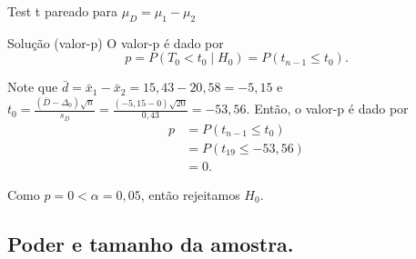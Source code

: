 \documentclass[9pt]{beamer}
\begin{document}
\begin{frame}{Test t pareado para $\mu_D = \mu_1 - \mu_2$}

\begin{block}{Solução (valor-p)}
	O valor-p é dado por
	$$p = P(T_0 < t_0 \mid H_0) = P(t_{n-1} \leq t_0).$$
	
	Note que $\bar{d} = \bar{x}_1 - \bar{x}_2 = 15,43 - 20,58 = -5,15$ e $t_0 = \frac{(\bar{D} - \Delta_0)\sqrt{n}}{s_D} = \frac{(-5,15 - 0)\sqrt{20}}{0,43} = -53,56$. Então, o valor-p é dado por
	\begin{align*}
	p &= P(t_{n-1} \leq t_0)\\
	&= P(t_{19} \leq -53,56)\\
	&= 0.
	\end{align*}
	
	Como $p=0 < \alpha = 0,05$, então rejeitamos $H_0$.
\end{block}

\end{frame}

\subsection{Poder e tamanho da amostra.}
\end{document}
